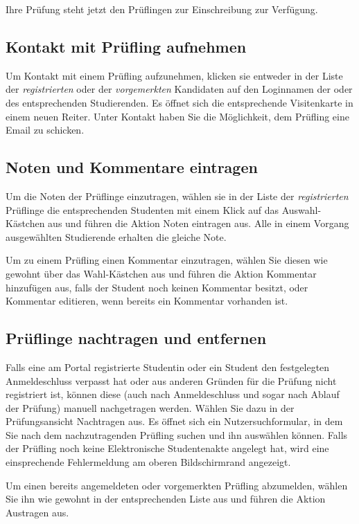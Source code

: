 \documentclass[a4paper,11pt]{article}
\newcommand{\knopf}[1]{{\sc #1}}
\begin{document}
Ihre Prüfung steht jetzt den Prüflingen zur Einschreibung zur Verfügung.

\subsection{Kontakt mit Prüfling aufnehmen}

Um Kontakt mit einem Prüfling aufzunehmen, klicken sie entweder in der Liste
der {\em registrierten} oder der {\em vorgemerkten} Kandidaten auf den
Loginnamen der oder des entsprechenden Studierenden. Es öffnet sich die
entsprechende \knopf{Visitenkarte} in einem neuen Reiter. Unter
\knopf{Kontakt} haben Sie die Möglichkeit, dem Prüfling eine Email zu
schicken.

\subsection{Noten und Kommentare eintragen}

Um die Noten der Prüflinge einzutragen, wählen sie in der Liste der {\em
  registrierten} Prüflinge die entsprechenden Studenten mit einem
Klick auf das Auswahl-Kästchen aus und führen die Aktion \knopf{Noten
  eintragen} aus. Alle in einem Vorgang ausgewählten Studierende erhalten die
gleiche Note.

Um zu einem Prüfling einen Kommentar einzutragen, wählen Sie diesen
wie gewohnt über das Wahl-Kästchen aus und führen die Aktion \knopf{Kommentar
  hinzufügen} aus, falls der Student noch keinen Kommentar besitzt, oder
\knopf{Kommentar editieren}, wenn bereits ein Kommentar vorhanden ist.

\subsection{Prüflinge nachtragen und entfernen}

Falls eine am Portal registrierte Studentin oder ein Student den festgelegten Anmeldeschluss
verpasst hat oder aus anderen Gründen für die Prüfung nicht registriert ist,
können diese (auch nach Anmeldeschluss und sogar nach Ablauf der Prüfung)
manuell nachgetragen werden. Wählen Sie dazu in der Prüfungsansicht \knopf{Nachtragen}
aus. Es öffnet sich ein Nutzersuchformular, in dem Sie nach dem
nachzutragenden Prüfling suchen und ihn auswählen können. Falls der Prüfling
noch keine Elektronische Studentenakte angelegt hat, wird eine einsprechende
Fehlermeldung am oberen Bildschirmrand angezeigt.

Um einen bereits angemeldeten oder vorgemerkten Prüfling abzumelden, wählen
Sie ihn wie gewohnt in der entsprechenden Liste aus und führen die Aktion
\knopf{Austragen} aus.
\end{document}
